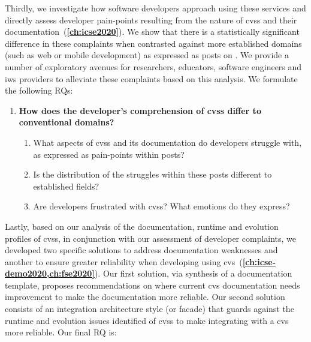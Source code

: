Thirdly, we investigate how software developers approach using these services and directly assess developer pain-points resulting from the nature of \glspl{cvs} and their documentation~(\textbf{\cref{ch:icse2020}}). We show that there is a statistically significant difference in these complaints when contrasted against more established  domains (such as web or mobile development) as expressed as posts on . We provide a number of exploratory avenues for researchers, educators, software engineers and \gls{iws} providers to alleviate these complaints based on this analysis. We formulate the following RQs:

\begin{leftbar}
\begin{enumerate}[label=\faQuestionCircle~~\textbf{RQ\arabic*.}, ref=RQ\arabic*, leftmargin=2.75\parindent, rightmargin=1\parindent,start=3]
  \item \textbf{How does the developer's comprehension of \glspl{cvs} differ to conventional  domains?}\label{rq:icse} %
  \begin{enumerate}[label=\textit{RQ3.\arabic*.}, ref=RQ3.\arabic*]
    \item What aspects of \glspl{cvs} and its documentation do developers struggle with, as expressed as pain-points within  posts?\label{rq:icse:rq1}%
    \item Is the distribution of the struggles within these posts different to established  fields?\label{rq:icse:rq2}%
    \item Are developers frustrated with \glspl{cvs}? What emotions do they express? \label{rq:semotion}
  \end{enumerate}
\end{enumerate}
\end{leftbar}


Lastly, based on our analysis of the documentation, runtime and evolution profiles of \glspl{cvs}, in conjunction with our assessment of developer complaints, we developed two specific solutions to address documentation weaknesses and another to ensure greater reliability when developing using \gls{cvs}~(\textbf{\cref{ch:icse-demo2020,ch:fse2020}}). Our first solution, via synthesis of a documentation template, proposes recommendations on where current \gls{cvs} documentation needs improvement to make the documentation more reliable. Our second solution consists of an integration architecture style (or facade) that guards against the runtime and evolution issues identified of \glspl{cvs} to make integrating with a \gls{cvs} more reliable. Our final RQ is:

